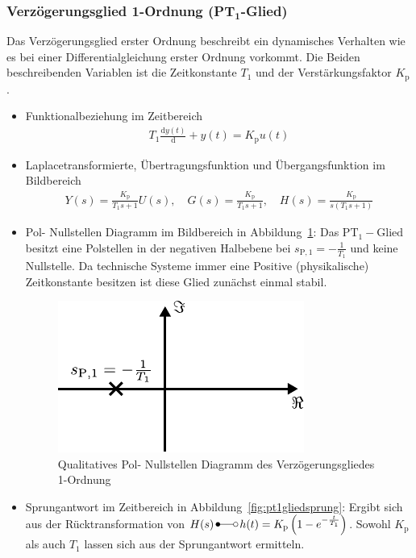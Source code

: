 \subsubsection{Verzögerungsglied 1-Ordnung (PT$_{\boldsymbol{1}}$-Glied)}
%
Das Verzögerungsglied erster Ordnung beschreibt ein dynamisches Verhalten wie es bei einer Differentialgleichung erster Ordnung vorkommt. Die Beiden beschreibenden Variablen ist die Zeitkonstante $T_{1}$ und der Verstärkungsfaktor $K_{\text{p}}$.
%
\begin{itemize}
	\item Funktionalbeziehung im Zeitbereich
	\begin{equation*}
	\begin{aligned}
	T_{1}\frac{\text{d}y(t)}{\text{d}}+y(t)=K_{\text{p}}u(t)
	\end{aligned}
	\end{equation*}
	\item Laplacetransformierte, Übertragungsfunktion und Übergangsfunktion im Bildbereich
	\begin{equation*}
	\begin{aligned}
	Y(s)=\frac{K_{\text{p}}}{T_{1}s+1}U(s),\quad G(s)=\frac{K_{\text{p}}}{T_{1}s+1},\quad H(s)=\frac{K_{\text{p}}}{s\left(T_{1}s+1\right)}
	\end{aligned}
	\end{equation*}
	\item Pol- Nullstellen Diagramm im Bildbereich in Abbildung~\ref{fig:pt1gliedpn}: Das $\text{PT}_{1}-\text{Glied}$ besitzt eine Polstellen in der negativen Halbebene bei $s_{\text{P},1}=-\frac{1}{T_{1}}$ und keine Nullstelle. Da technische Systeme immer eine Positive (physikalische) Zeitkonstante besitzen ist diese Glied zunächst einmal stabil.
	\begin{figure}[h]
		\centering
		\includegraphics[width=0.4\linewidth]{Abbildungen/Modellbildung/PDF/PT1gliedpn.pdf}
		\caption{Qualitatives Pol- Nullstellen Diagramm des Verzögerungsgliedes 1-Ordnung}
		\label{fig:pt1gliedpn}
	\end{figure}
	\item Sprungantwort im Zeitbereich in Abbildung~\ref{fig:pt1gliedsprung}: Ergibt sich aus der Rücktransformation von $H(s) \,\Laplace\, h(t)=K_{\text{p}}\left(1-e^{-\frac{t}{T_{1}}}\right)$. Sowohl $K_{\text{p}}$ als auch $T_{1}$ lassen sich aus der Sprungantwort ermitteln.

\end{itemize}
